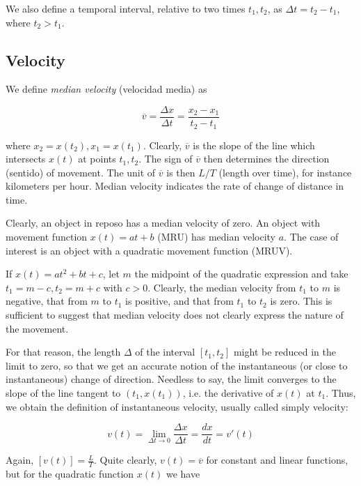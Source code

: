 \documentclass[12pt]{article}
\theoremstyle{definition}
\begin{document}
We also define a temporal interval, relative to two times $t_1, t_2$, as $\Delta
t = t_2 - t_1$, where $t_2 > t_1$. 

\subsection{Velocity}

We define \textit{median velocity} (velocidad media) as 

\begin{equation}
    \overline{v} = \frac{\Delta x}{\Delta t} = \frac{x_2 - x_1}{t_2 - t_1}
\end{equation}

where $x_2 = x(t_2), x_1 = x(t_1)$. Clearly, $\overline{v}$ is the slope of the
line which intersects $x(t)$ at points $t_1, t_2$. The sign of $\overline{v}$
then determines the direction (sentido) of movement. The unit of $\overline{v}$
is then $L / T$ (length over time), for instance kilometers per hour. Median
velocity indicates the rate of change of distance in time.

Clearly, an object in reposo has a median velocity of zero. An object with
movement function $x(t) = at + b$ (MRU) has median velocity $a$. The case of
interest is an object with a quadratic movement function (MRUV).

If $x(t) = at^2 + b t + c$, let $m$ the midpoint of the quadratic expression and 
take $t_1 = m - c, t_2 = m + c$ with $c > 0$. Clearly, the median velocity from 
$t_1$ to $m$ is negative, that from $m$ to $t_1$ is positive, and that from 
$t_1$ to $t_2$ is zero. This is sufficient to suggest that median velocity does
not clearly express the nature of the movement. 

For that reason, the length $\Delta$ of the interval $[t_1, t_2]$ might be
reduced in the limit to zero, so that we get an accurate notion of the
instantaneous (or close to instantaneous) change of direction. Needless to say,
the limit converges to the slope of the line  tangent to $(t_1, x(t_1))$, i.e.
the derivative of $x(t)$ at $t_1$. Thus, we obtain the definition of
instantaneous velocity, usually called simply velocity: 

\begin{equation}
    v(t) = \lim_{\Delta t \to 0} \frac{\Delta x}{\Delta t} = \frac{dx}{dt} =
    v'(t)
\end{equation}

Again, $\left[ v(t) \right] = \frac{L}{T}$. Quite clearly, $v(t) = \overline{v}$
for constant and linear functions, but for the quadratic function $x(t)$ we
have 
\end{document}

